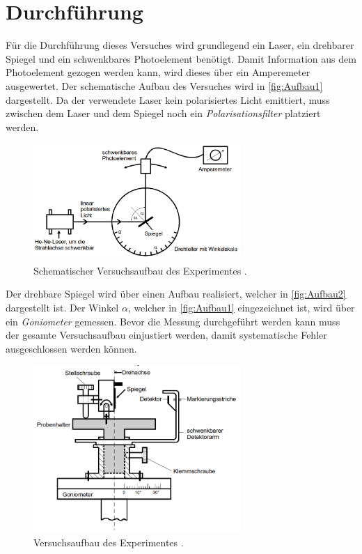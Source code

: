 \section{Durchführung}
\label{sec:Durchführung}
Für die Durchführung dieses Versuches wird grundlegend ein Laser, ein drehbarer Spiegel und ein schwenkbares Photoelement benötigt. Damit Information aus dem Photoelement 
gezogen werden kann, wird dieses über ein Amperemeter ausgewertet. Der schematische Aufbau des Versuches wird in \autoref{fig:Aufbau1} dargestellt. Da der verwendete Laser 
kein polarisiertes Licht emittiert, muss zwischen dem Laser und dem Spiegel noch ein \textit{Polarisationsfilter} platziert werden. 

\begin{figure}
    \centering
    \includegraphics[width = 0.7\textwidth]{content/Aufbau1.png}
    \caption{Schematischer Versuchsaufbau des Experimentes \cite{v407}.}
    \label{fig:Aufbau1}
\end{figure}

Der drehbare Spiegel wird über einen Aufbau realisiert, welcher in \autoref{fig:Aufbau2} dargestellt ist. Der Winkel $\alpha$, welcher in \autoref{fig:Aufbau1} eingezeichnet 
ist, wird über ein \textit{Goniometer} gemessen. Bevor die Messung durchgeführt werden kann muss der gesamte Versuchsaufbau einjustiert werden, damit systematische Fehler 
ausgeschlossen werden können.  

\begin{figure}
    \centering
    \includegraphics[width = 0.7\textwidth]{content/Aufbau2.png}
    \caption{Versuchsaufbau des Experimentes \cite{v407}.}
    \label{fig:Aufbau2}
\end{figure}

